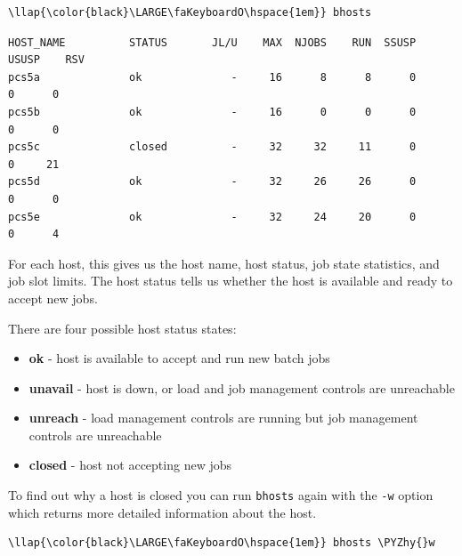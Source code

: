 \documentclass[11pt]{article}
\providecommand{\tightlist}{%
      \setlength{\itemsep}{0pt}\setlength{\parskip}{0pt}}
\def\PYZhy{\char`\-}
\begin{document}
\begin{terminalinput}
\begin{Verbatim}[commandchars=\\\{\}]
\llap{\color{black}\LARGE\faKeyboardO\hspace{1em}} bhosts
\end{Verbatim}
\end{terminalinput}


    \begin{verbatim}
HOST_NAME          STATUS       JL/U    MAX  NJOBS    RUN  SSUSP  USUSP    RSV
pcs5a              ok              -     16      8      8      0      0      0
pcs5b              ok              -     16      0      0      0      0      0
pcs5c              closed          -     32     32     11      0      0     21
pcs5d              ok              -     32     26     26      0      0      0
pcs5e              ok              -     32     24     20      0      0      4
\end{verbatim}

    For each host, this gives us the host name, host status, job state
statistics, and job slot limits. The host status tells us whether the
host is available and ready to accept new jobs.

There are four possible host status states:

\begin{itemize}
\tightlist
\item
  \textbf{ok} - host is available to accept and run new batch jobs
\item
  \textbf{unavail} - host is down, or load and job management controls
  are unreachable
\item
  \textbf{unreach} - load management controls are running but job
  management controls are unreachable
\item
  \textbf{closed} - host not accepting new jobs
\end{itemize}

To find out why a host is closed you can run \texttt{bhosts} again with
the \texttt{-w} option which returns more detailed information about the
host.

\begin{terminalinput}
\begin{Verbatim}[commandchars=\\\{\}]
\llap{\color{black}\LARGE\faKeyboardO\hspace{1em}} bhosts \PYZhy{}w
\end{Verbatim}
\end{terminalinput}
\end{document}
